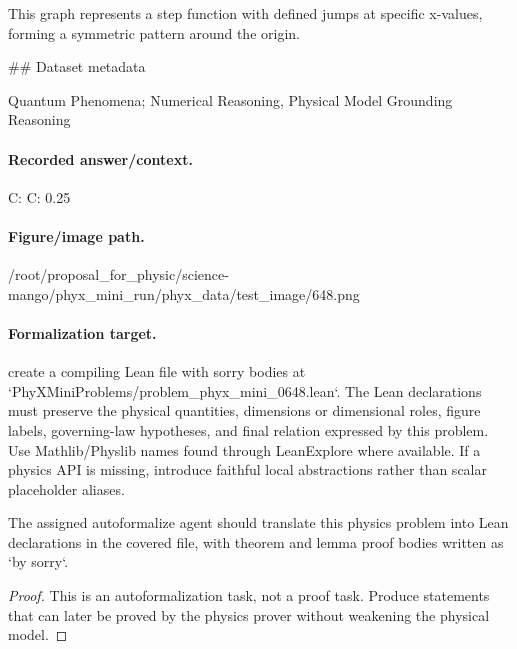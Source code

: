 This graph represents a step function with defined jumps at specific x-values, forming a symmetric pattern around the origin.

\#\# Dataset metadata

Quantum Phenomena; Numerical Reasoning, Physical Model Grounding Reasoning

\paragraph{Recorded answer/context.}
C: C: 0.25

\paragraph{Figure/image path.}
/root/proposal\_for\_physic/science-mango/phyx\_mini\_run/phyx\_data/test\_image/648.png

\paragraph{Formalization target.}
create a compiling Lean file with sorry bodies at `PhyXMiniProblems/problem\_phyx\_mini\_0648.lean`. The Lean declarations must preserve the physical quantities, dimensions or dimensional roles, figure labels, governing-law hypotheses, and final relation expressed by this problem.
Use Mathlib/Physlib names found through LeanExplore where available. If a physics API is missing, introduce faithful local abstractions rather than scalar placeholder aliases.

\begin{theorem}
\label{thm:physics:phyx_mini_0648:target}
The assigned autoformalize agent should translate this physics problem into Lean declarations in the covered file, with theorem and lemma proof bodies written as `by sorry`.
\end{theorem}
\begin{proof}
This is an autoformalization task, not a proof task. Produce statements that can later be proved by the physics prover without weakening the physical model.
\end{proof}

